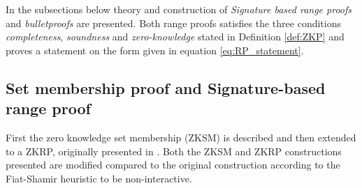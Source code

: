 In the subsections below theory and construction of \textit{Signature based range proofs} and \textit{bulletproofs} are presented. Both range proofs satisfies the three conditions \textit{completeness}, \textit{soundness} and \textit{zero-knowledge} stated in Definition \ref{def:ZKP} and proves a statement on the form given in equation \eqref{eq:RP_statement}.




\subsection{Set membership proof and Signature-based  range proof}
First the zero knowledge set membership (ZKSM) is described and then extended to a ZKRP, originally presented in \cite{RANGE-SET}. Both the ZKSM and ZKRP constructions presented are modified compared to the original construction according to the Fiat-Shamir heuristic to be non-interactive.

